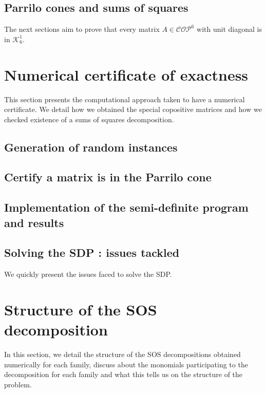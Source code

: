 \documentclass[onecolumn,11pt,a4paper]{article}
\theoremstyle{plain}  %
\theoremstyle{remark}  %
\begin{document}
\subsection{Parrilo cones and sums of squares}
\label{sub:parrilo}
The next sections aim to prove that every matrix $A \in \mathcal{COP}^6$ with unit diagonal is in $\mathcal{K}_6^1$.
\section{Numerical certificate of exactness}
\label{sec:computation}
This section presents the computational approach taken to have a numerical certificate.
We detail how we obtained the special copositive matrices and how we checked existence of a sums of squares decomposition.
\subsection{Generation of random instances}
\label{sub:generation}
\subsection{Certify a matrix is in the Parrilo cone}
\label{sub:parrilo-certificate}
\subsection{Implementation of the semi-definite program and results}
\label{sub:sdp}
\subsection{Solving the SDP : issues tackled}
\label{sub:solving-issues}
We quickly present the issues faced to solve the SDP.
\section{Structure of the SOS decomposition}
\label{sec:sos-structure}
In this section, we detail the structure of the SOS decompositions obtained numerically for each family,
discuss about the monomials participating to the decomposition for each family and what this tells us on
the structure of the problem.
\end{document}
